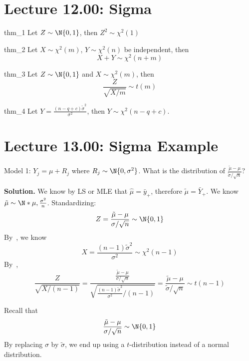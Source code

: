 \section{Lecture 12.00: Sigma}
\begin{Theorem}{}{thm_1}
    Let $ Z \sim \N{0,1} $, then $ Z^2 \sim \chi^2(1) $
\end{Theorem}
\begin{Theorem}{}{thm_2}
    Let $ X \sim \chi^2(m) $, $ Y \sim \chi^2(n) $
    be independent, then
    \[ X+Y \sim \chi^2(n+m) \]
\end{Theorem}
\begin{Theorem}{}{thm_3}
    Let $ Z \sim \N{0,1} $ and $ X \sim \chi^2(m) $, then
    \[ \frac{Z}{\sqrt{X/m}} \sim t(m) \]
\end{Theorem}
\begin{Theorem}{}{thm_4}
    Let $ \displaystyle Y=\frac{(n-q+c)\tilde{\sigma}^2}{\sigma^2} $,
    then $ Y \sim \chi^2(n-q+c) $.
\end{Theorem}
\section{Lecture 13.00: Sigma Example}
\begin{Example}{}{}
    Model 1: $ Y_j=\mu+R_j $ where $ R_j \sim \N{0,\sigma^2} $.
    What is the distribution of $ \displaystyle \frac{\tilde{\mu}-\mu}{\tilde{\sigma}/\sqrt{n}} $?

    \textbf{Solution.} We know by LS or MLE that $ \hat{\mu}=\bar{y}_+ $, therefore
    $ \tilde{\mu}=\bar{Y}_+ $. We know $ \tilde{\mu} \sim \N*{\mu,\frac{\sigma^2}{n}} $.
    Standardizing:
    \[ Z=\frac{\tilde{\mu}-\mu}{\sigma/\sqrt{n}}\sim \N{0,1}  \]
    By~, we know
    \[ X=\frac{(n-1)\tilde{\sigma}^2}{\sigma^2}\sim \chi^2(n-1)  \]
    By~,
    \[ \frac{Z}{\sqrt{X/(n-1)}}
        =\frac{\displaystyle \frac{\tilde{\mu}-\mu}{\sigma/\sqrt{n}}}{\displaystyle \sqrt{\frac{(n-1)\tilde{\sigma}^2}{\sigma^2}\bigg/(n-1)}}
        =\frac{\tilde{\mu}-\mu}{\tilde{\sigma}/\sqrt{n}}\sim t(n-1)   \]
\end{Example}
\begin{Remark}{}{}
    Recall that
    \[ \frac{\tilde{\mu}-\mu}{\sigma/\sqrt{n}}\sim \N{0,1}  \]
    By replacing $ \sigma $ by $ \tilde{\sigma} $, we end up using a $ t $-distribution
    instead of a normal distribution.
\end{Remark}
